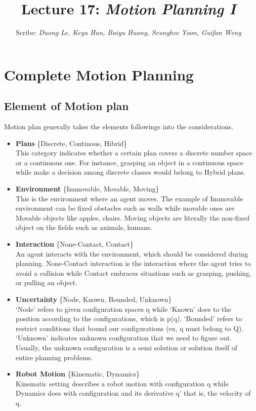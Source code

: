 \documentclass[11pt]{article}
\title{Lecture 17: \it{Motion Planning I}}
\author{Scribe:  \it{Duong Le, Keyu Han, Baiyu Huang, Seunghee Yoon, Guifan Weng}}
\date{}
\begin{document}
\maketitle
\thispagestyle{fancy}
\section{Complete Motion Planning}

\subsection{Element of Motion plan}
Motion plan generally takes the elements followings into the considerations. 
\begin{itemize}
\item \textbf{Plans} \{Discrete, Continous, Hibrid\} \\
This category indicates whether a certain plan covers a discrete number space or a continuous one. For instance, grasping an object in a continuous space while make a decision among discrete classes would belong to Hybrid plans.
\item \textbf{Environment} \{Immovable, Movable, Moving\}\\
This is the environment where an agent moves. The example of Immovable environment can be fixed obstacles such as walls while movable ones are Movable objects like apples, chairs. Moving objects are literally the non-fixed object on the fields such as animals, humans.
\item \textbf{Interaction} \{None-Contact, Contact\}\\
An agent interacts with the environment, which should be considered during planning. None-Contact interaction is the interaction where the agent tries to avoid a collision while Contact embraces situations such as grasping, pushing, or pulling an object.
\item \textbf{Uncertainty} \{Node, Known, Bounded, Unknown\}\\
‘Node’ refers to given configuration spaces q while ‘Known’ does to the position according to the configurations, which is p(q). ‘Bounded’ refers to restrict conditions that bound our configurations (ex, q must belong to Q). ‘Unknown’ indicates unknown configuration that we need to figure out. Usually, the unknown configuration is a semi solution or solution itself of entire planning problems. 
\item \textbf{Robot Motion} \{Kinematic, Dynamics\}\\
Kinematic setting describes a robot motion with configuration q while Dynamics does with configuration and its derivative q’ that is, the velocity of q.
\end{itemize}
\end{document}
